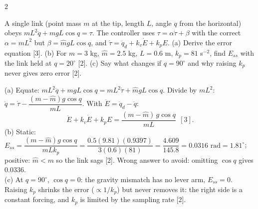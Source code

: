 \begin{multicols}{2}
\begin{examq}
A single link (point mass $m$ at the tip, length $L$, angle $q$ from the horizontal) obeys $mL^2\ddot q+mgL\cos q=\tau$. The controller uses $\tau=\alpha\acute\tau+\beta$ with the correct $\alpha=mL^2$ but $\beta=\hat mgL\cos q$, and $\acute\tau=\ddot q_d+k_v\dot E+k_pE$. (a) Derive the error equation [3]. (b) For $m=3$ kg, $\hat m=2.5$ kg, $L=0.6$ m, $k_p=81$ s$^{-2}$, find $E_{ss}$ with the link held at $q=20^\circ$ [2]. (c) Say what changes if $q=90^\circ$ and why raising $k_p$ never gives zero error [2].
\end{examq}
\begin{examq}[EQ2: solution]
\solution
(a) Equate: $mL^2\ddot q+mgL\cos q=mL^2\acute\tau+\hat mgL\cos q$. Divide by $mL^2$: $\ddot q=\acute\tau-\dfrac{(m-\hat m)g\cos q}{mL}$. With $\ddot E=\ddot q_d-\ddot q$:
\[\boxed{\ddot E+k_v\dot E+k_pE=\frac{(m-\hat m)\,g\cos q}{mL}}\ \ [3].\]
(b) Static: $E_{ss}=\dfrac{(m-\hat m)g\cos q}{mLk_p}=\dfrac{0.5(9.81)(0.9397)}{3(0.6)(81)}=\dfrac{4.609}{145.8}=\boxed{0.0316\text{ rad}}=1.81^\circ$; positive: $\hat m<m$ so the link sags [2]. Wrong answer to avoid: omitting $\cos q$ gives $0.0336$.\\
(c) At $q=90^\circ$, $\cos q=0$: the gravity mismatch has no lever arm, $E_{ss}=0$. Raising $k_p$ shrinks the error ($\propto1/k_p$) but never removes it: the right side is a constant forcing, and $k_p$ is limited by the sampling rate [2]. \chk
\end{examq}


\end{multicols}
